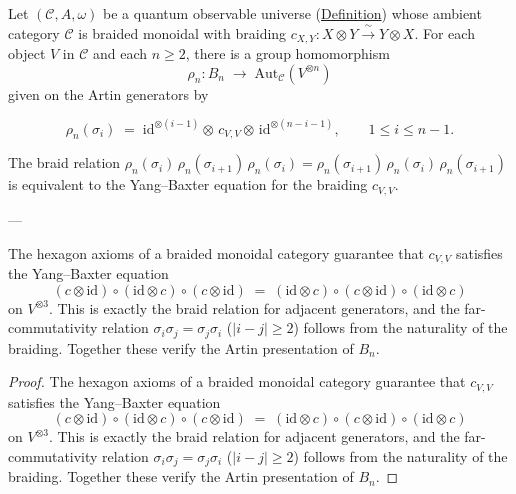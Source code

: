 \begin{proposition}
  \label{prop:braid-action-tensor}
Let $(\mathcal{C}, A, \omega)$ be a quantum observable universe
(\hyperref[def:quantum-observable-universe]{Definition}) whose ambient category
$\mathcal{C}$ is braided monoidal with braiding
$c_{X,Y}\colon X\otimes Y \xrightarrow{\;\sim\;} Y\otimes X$.
For each object $V$ in $\mathcal{C}$ and each $n \geq 2$, there is a
group homomorphism
\[
\rho_n\colon B_n \;\longrightarrow\; \mathrm{Aut}_{\mathcal{C}}(V^{\otimes n})
\]
given on the Artin generators by

\begin{equation}\label{eq:categorical-braid-rep}
  \rho_n(\sigma_i)
  \;=\;
  \mathrm{id}^{\otimes(i-1)}
  \otimes\, c_{V,V}
  \otimes\, \mathrm{id}^{\otimes(n-i-1)},
  \qquad 1 \leq i \leq n-1.
\end{equation}

The braid relation
$\rho_n(\sigma_i)\,\rho_n(\sigma_{i+1})\,\rho_n(\sigma_i)
= \rho_n(\sigma_{i+1})\,\rho_n(\sigma_i)\,\rho_n(\sigma_{i+1})$
is equivalent to the Yang--Baxter equation for the braiding $c_{V,V}$.

---

The hexagon axioms of a braided monoidal category guarantee that
$c_{V,V}$ satisfies the Yang--Baxter equation
\[
(c \otimes \mathrm{id})
  \circ (\mathrm{id} \otimes c)
  \circ (c \otimes \mathrm{id})
  \;=\;
  (\mathrm{id} \otimes c)
  \circ (c \otimes \mathrm{id})
  \circ (\mathrm{id} \otimes c)
\]
on $V^{\otimes 3}$.  This is exactly the braid relation for adjacent
generators, and the far-commutativity relation
$\sigma_i\sigma_j = \sigma_j\sigma_i$ ($\lvert i-j\rvert \geq 2$) follows
from the naturality of the braiding.  Together these verify the Artin
presentation of $B_n$.
\end{proposition}
\begin{proof}
The hexagon axioms of a braided monoidal category guarantee that
$c_{V,V}$ satisfies the Yang--Baxter equation
\[
(c \otimes \mathrm{id})
  \circ (\mathrm{id} \otimes c)
  \circ (c \otimes \mathrm{id})
  \;=\;
  (\mathrm{id} \otimes c)
  \circ (c \otimes \mathrm{id})
  \circ (\mathrm{id} \otimes c)
\]
on $V^{\otimes 3}$.  This is exactly the braid relation for adjacent
generators, and the far-commutativity relation
$\sigma_i\sigma_j = \sigma_j\sigma_i$ ($\lvert i-j\rvert \geq 2$) follows
from the naturality of the braiding.  Together these verify the Artin
presentation of $B_n$.
\end{proof}

